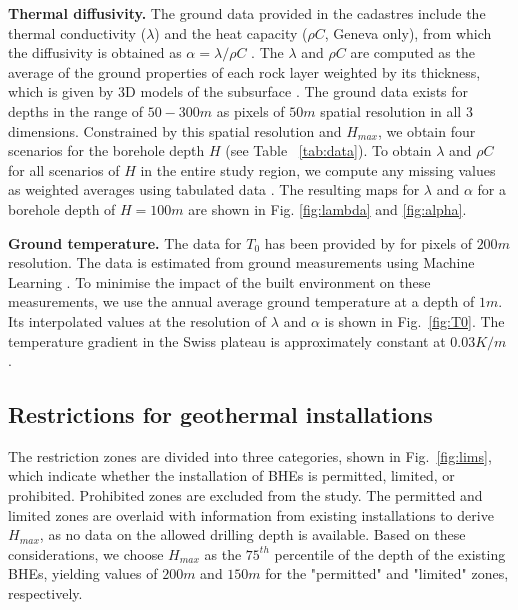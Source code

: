 \textbf{Thermal diffusivity.}
The ground data provided in the cadastres include the thermal conductivity ($\lambda$) and the heat capacity ($\rho C$, Geneva only), from which the diffusivity is obtained as $\alpha = \lambda / \rho C$ \cite{pahud_geothermal_2002}.
The $\lambda$ and $\rho C$ are computed as the average of the ground properties of each rock layer weighted by %
its thickness, which is given by 3D models of the subsurface \cite{groupe_de_travail_pgg_evaluation_2011-1}.
The ground data exists for depths in the range of $50-300m$ as pixels of $50m$ spatial resolution in all 3 dimensions. 
Constrained by this spatial resolution and $H_{max}$, we obtain four scenarios for the borehole depth $H$ (see Table ~\ref{tab:data}).
To obtain $\lambda$ and $\rho C$ for all scenarios of $H$ in the entire study region, we compute any missing values as weighted averages using
tabulated data \cite{groupe_de_travail_pgg_evaluation_2011-1, sia_sondes_2010}. 
The resulting maps for $\lambda$ and $\alpha$ for a borehole depth of $H = 100m$ are shown in Fig. \ref{fig:lambda} and \ref{fig:alpha}.

\textbf{Ground temperature.}
The data for $T_0$ has been provided by \citet{assouline_machine_2019} for pixels of $200m$ resolution.
The data is estimated from ground measurements using Machine Learning \cite{assouline_machine_2019}.
To minimise the impact of the built environment on these measurements, we use the annual average ground temperature at a depth of $1m$.
Its interpolated values at the resolution of $\lambda$ and $\alpha$ is shown in Fig.~\ref{fig:T0}.
The temperature gradient in the Swiss plateau is approximately constant at $0.03K/m$ \cite{sia_sondes_2010}.

\subsection{Restrictions for geothermal installations}

The restriction zones are divided into three categories, shown in Fig.~\ref{fig:lims}, which indicate whether the installation of BHEs is permitted, limited, or prohibited.
Prohibited zones are excluded from the study. 
The permitted and limited zones are overlaid with information from existing installations to derive $H_{max}$, as no data on the allowed drilling depth is available.
Based on these considerations,
we choose $H_{max}$ as the $75^{th}$ percentile of the depth of the existing BHEs, yielding values of $200m$ and $150m$ for the "permitted" and "limited" zones, respectively. 
